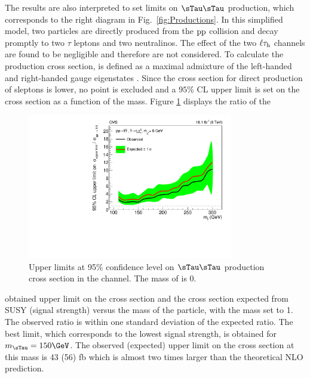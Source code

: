 The results are also interpreted to set limits on $\sTau\sTau$ production, 
which corresponds to the right diagram in Fig.~\ref{fig:Productions}. 
In this simplified model, two \sTau particles are directly produced from the $\rm{pp}$ collision and decay promptly to two $\tau$ leptons and two neutralinos. 
The effect of the two $\ell\tau_{\rm h}$ channels are found to be negligible and therefore are not considered.
To calculate the production cross section, \sTau is 
defined as a maximal admixture of the left-handed and right-handed \sTau gauge eigenstates \cite{Fuks:2013lya}. 
Since the cross section for direct production of sleptons is lower, no point is excluded and a $95\%$ CL upper limit is set on 
the cross section  as a function of the \sTau mass. 
Figure \ref{fig:limit_stau_stau} displays the ratio of the 
\begin{linenomath}
\begin{figure}[!htb]
\centering
\includegraphics[width=0.8\textwidth,keepaspectratio=true]{StatisticsFig/ExclusionSTauSTauLsp1.pdf}
\caption{Upper limits at 95\% confidence level on $\sTau\sTau$ production cross section in the \tauTau channel. The mass of \PSGczDo is 0\GeV.}
\label{fig:limit_stau_stau}
\end{figure}
\end{linenomath}
obtained upper limit on the cross section and the cross section expected from SUSY (signal strength) versus the mass of the \sTau particle, with the \PSGczDo mass set to 1\GeV.
The observed ratio is within one standard deviation of  the expected ratio.
The best limit, which corresponds to the lowest signal strength, is obtained for $m_{\sTau}=150\GeV$. The observed (expected) upper limit on the cross section at this mass is 43 (56) fb which is almost two  times larger than the theoretical NLO prediction.



